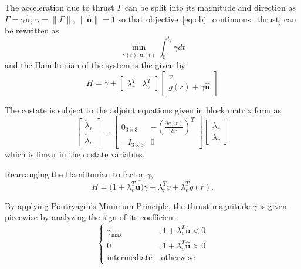 The acceleration due to thrust \(\Gamma \) can be split into its magnitude and direction as \(\Gamma = \gamma \hat{\mathbf{u}}\), \(\gamma = \lVert \Gamma \rVert\), \(\lVert \hat{\mathbf{u}} \rVert = 1\) so that objective~\eqref{eq:obj_continuous_thrust} can be rewritten as
\begin{equation}
    \min_{\gamma(t), \hat{\mathbf{u}}(t)} \int_0^{t_f} \gamma dt
\end{equation}
and the Hamiltonian of the system is the given by
\begin{equation}
    H = \gamma + \begin{bmatrix}
        \lambda_r^T & \lambda_v^T
    \end{bmatrix} \begin{bmatrix}
        v \\ g(r) + \gamma \hat{\mathbf{u}}
    \end{bmatrix}
\end{equation}

The costate is subject to the adjoint equations given in block matrix form as
\begin{equation}
    \begin{bmatrix}
        \dot{\lambda}_r \\ \dot{\lambda}_v
    \end{bmatrix} = \begin{bmatrix}
        0_{3\times3} & -\left(\frac{\partial g(r)}{\partial r}\right)^T \\
        -I_{3\times3} & 0
    \end{bmatrix} \begin{bmatrix}
        \lambda_r \\ \lambda_v
    \end{bmatrix}
\end{equation}
which is linear in the costate variables. 

Rearranging the Hamiltonian to factor \(\gamma \), 
\begin{equation}
    H = (1 + \lambda_v^T \hat{\mathbf{u})} \gamma + \lambda_r^T v + \lambda_v^T g(r).
\end{equation}

By applying Pontryagin's Minimum Principle, the thrust magnitude \(\gamma\) is given piecewise by analyzing the sign of its coefficient:
\begin{equation}
    \begin{cases}
        \gamma_{\max}&, 1+\lambda_v^T \hat{\mathbf{u}} < 0 \\
        0&, 1 + \lambda_v^T \hat{\mathbf{u}} > 0 \\
        \text{intermediate}&, \text{otherwise}
    \end{cases}
\end{equation}


